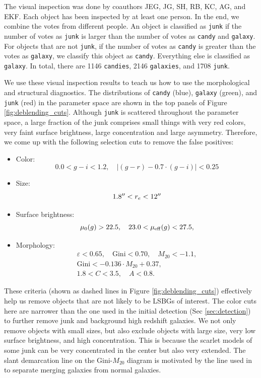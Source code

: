 \documentclass[twocolumn,astrosymb,twocolappendix]{aastex631}
\newcommand{\code}[1]{\texttt{#1}}
\begin{document}
\begin{CJK*}{UTF8}{gbsn}
The visual inspection was done by coauthors JEG, JG, SH, RB, KC, AG, and EKF. Each object has been inspected by at least one person. In the end, we combine the votes from different people. An object is classified as \code{junk} if the number of votes as \code{junk} is larger than the number of votes as \code{candy} and \code{galaxy}. For objects that are not \code{junk}, if the number of votes as \code{candy} is greater than the votes as \code{galaxy}, we classify this object as \code{candy}. Everything else is classified as \code{galaxy}. In total, there are 1146 \code{candies}, 2146 \code{galaxies}, and 1708 \code{junk}. 

We use these visual inspection results to teach us how to use the morphological and structural diagnostics. The distributions of \code{candy} (blue), \code{galaxy} (green), and \code{junk} (red) in the parameter space are shown in the top panels of Figure \ref{fig:deblending_cuts}. Although \code{junk} is scattered throughout the parameter space, a large fraction of the junk comprises small things with very red colors, very faint surface brightness, large concentration and large asymmetry. Therefore, we come up with the following selection cuts to remove the false positives:
\begin{itemize}
    \item Color:
    \[0.0 < g-i < 1.2,\quad |(g-r) - 0.7\cdot (g-i)| < 0.25\]
    \item Size: \[1.8 \mbox{$^{\prime\prime}$} < r_e < 12 \mbox{$^{\prime\prime}$}\]
    \item Surface brightness: \[\mu_0(g) > 22.5,\quad 23.0 < \mu_{\rm eff}(g) < 27.5,\]
    \item Morphology: 
    \begin{gather*}
        \varepsilon < 0.65,\quad \mathrm{Gini} < 0.70,\quad M_{20} < -1.1,\\
        \mathrm{Gini} < -0.136\cdot M_{20} + 0.37,\\
        1.8 < C < 3.5,\quad A < 0.8.
    \end{gather*}
\end{itemize}
These criteria (shown as dashed lines in Figure \ref{fig:deblending_cuts}) effectively help us remove objects that are not likely to be LSBGs of interest. The color cuts here are narrower than the one used in the initial detection (Sec \ref{sec:detection}) to further remove junk and background high redshift galaxies. We not only remove objects with small sizes, but also exclude objects with large size, very low surface brightness, and high concentration. This is because the scarlet models of some junk can be very concentrated in the center but also very extended. The slant demarcation line on the Gini-$M_{20}$ diagram is motivated by the line used in \citet{Lotz2008} to separate merging galaxies from normal galaxies. 


\end{CJK*}
\end{document}
